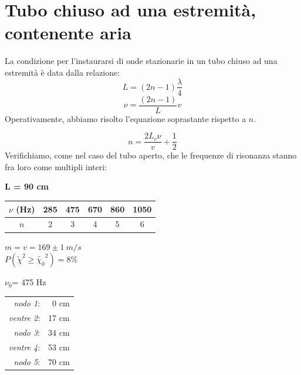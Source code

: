\section{Tubo chiuso ad una estremità, contenente aria}

La condizione per l'instaurarsi di onde stazionarie in un tubo chiuso ad una estremità è data dalla relazione:
\\
\begin{equation}
 L=(2n-1)\frac{\lambda}{4}
\end{equation}
\begin{equation}\label{freq2}
\nu=\frac{(2n-1)}{L}v
\end{equation}
Operativamente, abbiamo risolto l'equazione soprastante rispetto a $n$.

$$ n = \frac{2L_c\nu}{v} + \frac{1}{2} $$
Verifichiamo, come nel caso del tubo aperto, che le frequenze di risonanza stanno fra loro come multipli interi: 

\textbf{L = 90 cm}
\\
\begin{center}
\begin{tabular}{c|c|c|c|c|c}
$\nu$ (Hz) & 285 & 475 & 670 & 860 & 1050 \\
\midrule
$n$ & 2 & 3 & 4 & 5 & 6 \\
\end{tabular}
\end{center}


\begin{center}

$m = v = 169\pm 1\ m/s$
\\

$P(\tilde{\chi}^2\geq\tilde{\chi_0}^2)=8\%$
\end{center}

\begin{center}
$\nu_0$= 475 Hz\\
\begin{tabular}{r r}
\textit{nodo 1}: & 0 cm\\
\textit{ventre 2}: & 17 cm\\
\textit{nodo 3}: & 34 cm\\
\textit{ventre 4}: & 53 cm\\
\textit{nodo 5}: & 70 cm\\
\end{tabular}
\end{center}

